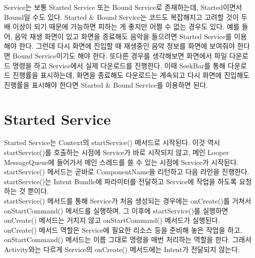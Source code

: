 Service는 보통 Started Service 또는 Bound Service로 존재하는데, Started이면서 Bound일 수도 있다. 
Started \& Bound Service는 코드도 복잡해지고 고려할 것이 두 배 이상이 되기 때문에 가능하면 피하는 게 좋지만 어쩔 수 없는 경우도 있다.
예를 들어, 음악 재생 화면이 있고 화면을 종료해도 음악을 들으려면 Started Service를 이용해야 한다. 
그런데 다시 화면에 진입할 때 재생중인 음악 정보를 화면에 보여줘야 한다면 Bound Service이기도 해야 한다.
또다른 경우를 생각해보면 화면에서 파일 다운로드 명령을 하고 Service에서 실제 다운로드를 진행한다. 
이때 SeekBar를 통해 다운로드 진행률을 표시하는데, 화면을 종료해도 다운로드는 계속되고 다시 화면에 진입해도 진행률을 표시해야 한다면 Started \& Bound Service를 이용하면 된다.

\section{Started Service}
Started Service는 Context의 startService() 메서드로 시작된다. 
이것 역시 startService()를 호출하는 시점에 Service가 바로 시작되지 않고, 메인 Looper MessageQueue에 들어가서 메인 스레드를 쓸 수 있는 시점에 Service가 시작된다. 
startService() 메서드는 곧바로 ComponentName을 리턴하고 다음 라인을 진행한다. startService()는 Intent Bundle에 파라미터를 전달하고 Service에 작업을 하도록 요청하는 것 뿐이다.\\

startService() 메서드를 통해 Service가 처음 생성되는 경우에는 onCreate()를 거쳐서 onStartCommand() 메서드를 실행하며, 그 이후에 startService()를 실행하면 onCreate() 메서드는 거치지 않고 onStartCommand() 메서드가 실행된다.
onCreate() 메서드 역할은 Service에 필요한 리소스 등을 준비해 놓은 작업을 하고, onStartCommand() 메서드는 이름 그대로 명령을 매번 처리하는 역할을 한다. 
그래서 Activity와는 다르게 Service의 onCreate() 메서드에는 Intent가 전달되지 않는다.\\

